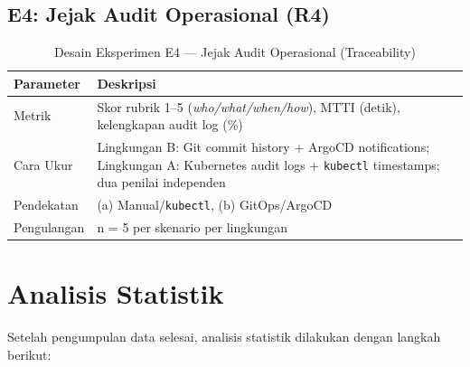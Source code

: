 \subsection{E4: Jejak Audit Operasional (R4)}

\begin{table}[H]
  \centering
  \caption{Desain Eksperimen E4 --- Jejak Audit Operasional (Traceability)}
  \label{tab:e4}
  \begin{tabular}{|l|p{9cm}|}
    \hline
    \textbf{Parameter} & \textbf{Deskripsi} \\
    \hline
    Metrik & Skor rubrik 1--5 (\textit{who/what/when/how}), MTTI (detik), kelengkapan audit log (\%) \\
    \hline
    Cara Ukur & Lingkungan B: Git commit history + ArgoCD notifications; Lingkungan A: Kubernetes audit logs + \texttt{kubectl} timestamps; dua penilai independen \\
    \hline
    Pendekatan & (a) Manual/\texttt{kubectl}, (b) GitOps/ArgoCD \\
    \hline
    Pengulangan & n = 5 per skenario per lingkungan \\
    \hline
  \end{tabular}
\end{table}

\section{Analisis Statistik}

Setelah pengumpulan data selesai, analisis statistik dilakukan dengan langkah berikut:

